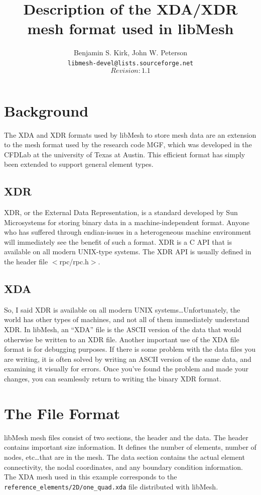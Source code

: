 \documentclass[12pt]{article}
\begin{document}
  
\title{Description of the XDA/XDR mesh format used in libMesh}
\author{Benjamin S. Kirk, John W. Peterson \\
        \texttt{libmesh-devel@lists.sourceforge.net} \\
	$$Revision: 1.1 $$} 
\maketitle

\section{Background}
The XDA and XDR formats used by libMesh to store mesh data are an extension to the mesh format used by the research code MGF, which was developed in the CFDLab at the university of Texas at Austin.  This efficient format has simply been extended to support general element types.

\subsection{XDR}
XDR, or the External Data Representation, is a standard developed by Sun Microsystems for storing binary data in a machine-independent format.  Anyone who has suffered through endian-issues in a heterogeneous machine environment will immediately see the benefit of such a format.  XDR is a C API that is available on all modern UNIX-type systems.  The XDR API is usually defined in the header file $<$rpc/rpc.h$>$.

\subsection{XDA}
So, I said XDR is available on all modern UNIX systems\ldots Unfortunately, the world has other types of machines, and not all of them immediately understand XDR.  In libMesh, an ``XDA'' file is the ASCII version of the data that would otherwise be written to an XDR file.  Another important use of the XDA file format is for debugging purposes.  If there is some problem with the data files you are writing, it is often solved by writing an ASCII version of the same data, and examining it visually for errors.  Once you've found the problem and made your changes, you can seamlessly return to writing the binary XDR format.

\section{The File Format}
libMesh mesh files consist of two sections, the header and the data.  The header contains important size information.  It defines the number of elements, number of nodes, etc\ldots that are in the mesh.  The data section contains the actual element connectivity, the nodal coordinates, and any boundary condition information.  The XDA mesh used in this example corresponds to the \texttt{reference\_elements/2D/one\_quad.xda} file distributed with libMesh.
\end{document}

